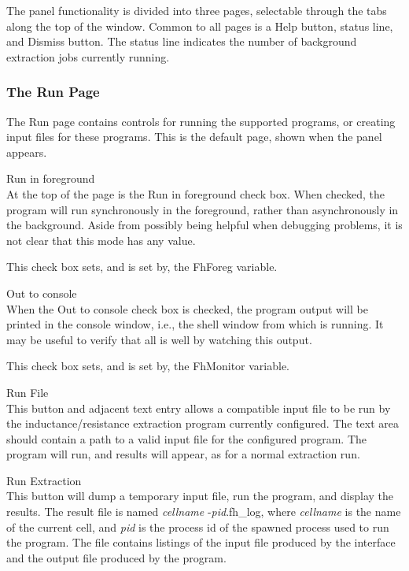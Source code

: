 The panel functionality is divided into three pages, selectable
through the tabs along the top of the window.  Common to all pages is
a {\cb Help} button, status line, and {\cb Dismiss} button.  The
status line indicates the number of background extraction jobs
currently running.

\subsubsection{The Run Page}

The {\cb Run} page contains controls for running the supported
programs, or creating input files for these programs.  This is the
default page, shown when the panel appears.

\begin{description}
\item{\cb Run in foreground}\\
At the top of the page is the {\cb Run in foreground} check box.  When
checked, the program will run synchronously in the foreground, rather
than asynchronously in the background.  Aside from possibly being
helpful when debugging problems, it is not clear that this mode has
any value.

This check box sets, and is set by, the {\et FhForeg} variable.

\item{\cb Out to console}\\
When the {\cb Out to console} check box is checked, the program output
will be printed in the console window, i.e., the shell window from
which {\Xic} is running.  It may be useful to verify that all is well
by watching this output.

This check box sets, and is set by, the {\et FhMonitor} variable.

\item{\cb Run File}\\
This button and adjacent text entry allows a compatible input file
to be run by the inductance/resistance extraction program
currently configured.  The text area should contain a path to a
valid input file for the configured program.  The program will
run, and results will appear, as for a normal extraction run.

\item{\cb Run Extraction}\\
This button will dump a temporary input file, run the program, and
display the results.  The result file is named {\it cellname\/}{\vt
-}{\it pid\/}{\vt .fh\_log}, where {\it cellname} is the name of the
current cell, and {\it pid} is the process id of the spawned process
used to run the program.  The file contains listings of the input file
produced by the interface and the output file produced by the program.


\end{description}
